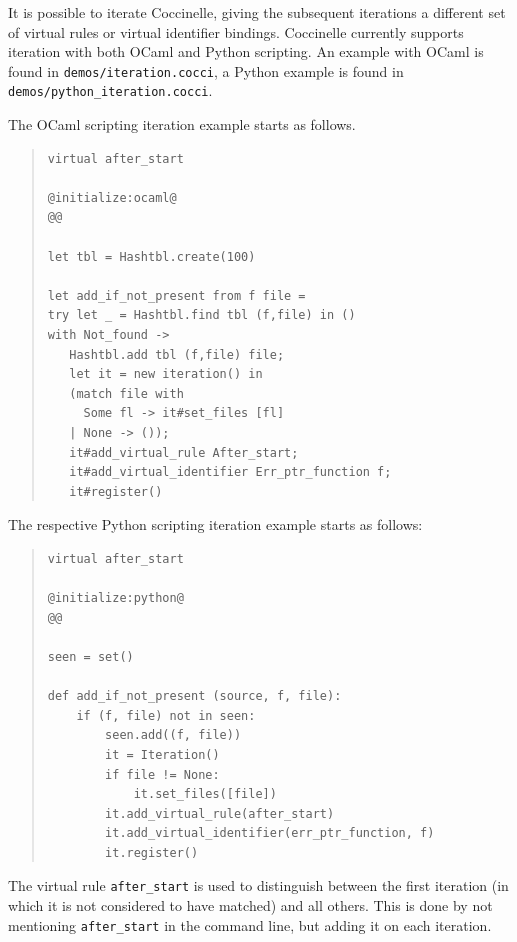 It is possible to iterate Coccinelle, giving the subsequent iterations a
different set of virtual rules or virtual identifier bindings.  Coccinelle
currently supports iteration with both OCaml and Python scripting. An
example with OCaml is found in {\tt demos/iteration.cocci}, a Python
example is found in {\tt demos/python\_iteration.cocci}.

The OCaml scripting iteration example starts as follows.

\begin{quote}
\begin{verbatim}
virtual after_start

@initialize:ocaml@
@@

let tbl = Hashtbl.create(100)

let add_if_not_present from f file =
try let _ = Hashtbl.find tbl (f,file) in ()
with Not_found ->
   Hashtbl.add tbl (f,file) file;
   let it = new iteration() in
   (match file with
     Some fl -> it#set_files [fl]
   | None -> ());
   it#add_virtual_rule After_start;
   it#add_virtual_identifier Err_ptr_function f;
   it#register()
\end{verbatim}
\end{quote}

The respective Python scripting iteration example starts as follows:

\begin{quote}
\begin{verbatim}
virtual after_start

@initialize:python@
@@

seen = set()

def add_if_not_present (source, f, file):
    if (f, file) not in seen:
        seen.add((f, file))
        it = Iteration()
        if file != None:
            it.set_files([file])
        it.add_virtual_rule(after_start)
        it.add_virtual_identifier(err_ptr_function, f)
        it.register()
\end{verbatim}
\end{quote}

The virtual rule {\tt after\_start} is used to distinguish between the
first iteration (in which it is not considered to have matched) and all
others.  This is done by not mentioning {\tt after\_start} in the command
line, but adding it on each iteration.

